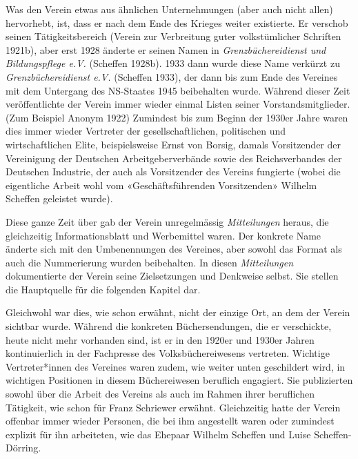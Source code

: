\documentclass[a4paper,
fontsize=11pt,
oneside,
numbers=noperiodatend,
parskip=half-,
bibliography=totoc,
final
]{scrartcl}
\begin{document}
Was den Verein etwas aus ähnlichen Unternehmungen (aber auch nicht
allen) hervorhebt, ist, dass er nach dem Ende des Krieges weiter
existierte. Er verschob seinen Tätigkeitsbereich (Verein zur Verbreitung
guter volkstümlicher Schriften 1921b), aber erst 1928 änderte er seinen
Namen in \emph{Grenzbüchereidienst und Bildungspflege e.V.} (Scheffen
1928b). 1933 dann wurde diese Name verkürzt zu \emph{Grenzbüchereidienst
e.V.} (Scheffen 1933), der dann bis zum Ende des Vereines mit dem
Untergang des NS-Staates 1945 beibehalten wurde. Während dieser Zeit
veröffentlichte der Verein immer wieder einmal Listen seiner
Vorstandsmitglieder. (Zum Beispiel Anonym 1922) Zumindest bis zum Beginn
der 1930er Jahre waren dies immer wieder Vertreter der
gesellschaftlichen, politischen und wirtschaftlichen Elite,
beispielsweise Ernst von Borsig, damals Vorsitzender der Vereinigung der
Deutschen Arbeitgeberverbände sowie des Reichsverbandes der Deutschen
Industrie, der auch als Vorsitzender des Vereins fungierte (wobei die
eigentliche Arbeit wohl vom «Geschäftsführenden Vorsitzenden» Wilhelm
Scheffen geleistet wurde).

Diese ganze Zeit über gab der Verein unregelmässig \emph{Mitteilungen}
heraus, die gleichzeitig Informationsblatt und Werbemittel waren. Der
konkrete Name änderte sich mit den Umbenennungen des Vereines, aber
sowohl das Format als auch die Nummerierung wurden beibehalten. In
diesen \emph{Mitteilungen} dokumentierte der Verein seine Zielsetzungen
und Denkweise selbst. Sie stellen die Hauptquelle für die folgenden
Kapitel dar.

Gleichwohl war dies, wie schon erwähnt, nicht der einzige Ort, an dem
der Verein sichtbar wurde. Während die konkreten Büchersendungen, die er
verschickte, heute nicht mehr vorhanden sind, ist er in den 1920er und
1930er Jahren kontinuierlich in der Fachpresse des Volksbüchereiwesens
vertreten. Wichtige Vertreter*innen des Vereines waren zudem, wie weiter
unten geschildert wird, in wichtigen Positionen in diesem Büchereiwesen
beruflich engagiert. Sie publizierten sowohl über die Arbeit des Vereins
als auch im Rahmen ihrer beruflichen Tätigkeit, wie schon für Franz
Schriewer erwähnt. Gleichzeitig hatte der Verein offenbar immer wieder
Personen, die bei ihm angestellt waren oder zumindest explizit für ihn
arbeiteten, wie das Ehepaar Wilhelm Scheffen und Luise Scheffen-Dörring.
\end{document}
